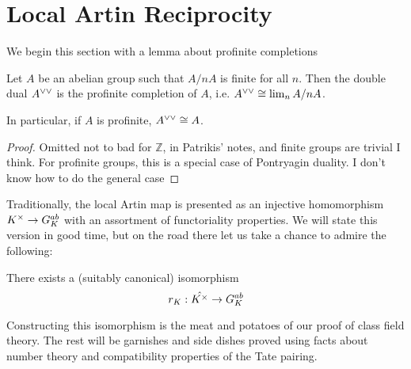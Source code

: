 
\section{Local Artin Reciprocity}

We begin this section with a lemma about 
profinite completions

\begin{lemma} \label{lem:double:dual}
	Let \(A\) be an abelian group such that 
	\(A / nA\) is finite for all \(n\). 
	Then the double dual \(A^{\vee\vee}\) is the
	profinite completion of \(A\), i.e.
	\(A^{\vee\vee} \cong \lim_{n} A / nA\).

	In particular, if \(A\) is profinite, 
	\(A^{\vee\vee} \cong A\).
\end{lemma}

\begin{proof}
	Omitted
	{\color{red} not to bad for \(\mathbb{Z}\), in Patrikis' notes,
    and finite groups are trivial I think.
	For profinite groups, this is a special case of
    Pontryagin duality.
    I don't know how to do the general case}
\end{proof}

Traditionally, the local Artin map is presented as an injective
homomorphism \(K^{\times} \to G_{K}^{ab}\) with an assortment of
functoriality properties. 
We will state this version in good time, but on the road there
let us take a chance to admire the following:

\begin{theorem}
	There exists a (suitably canonical) isomorphism
	\[
	r_{K} : \hat{K^{\times}} \to G_{K}^{ab}
	\] 
\end{theorem}

Constructing this isomorphism is the meat and potatoes
of our proof of class field theory. 
The rest will be garnishes and side dishes proved using
facts about number theory and compatibility properties
of the Tate pairing.

